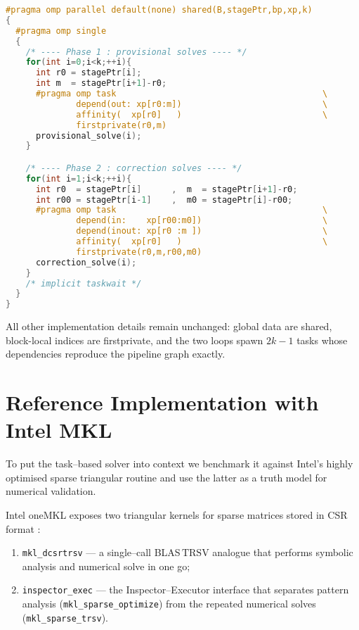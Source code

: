 \begin{lstlisting}[language=C++,caption={Core of
\texttt{blockBiDiagSolveTasksAffinity}.},label={lst:omp_skeleton_aff}]
#pragma omp parallel default(none) shared(B,stagePtr,bp,xp,k)
{
  #pragma omp single
  {
    /* ---- Phase 1 : provisional solves ---- */
    for(int i=0;i<k;++i){
      int r0 = stagePtr[i];
      int m  = stagePtr[i+1]-r0;
      #pragma omp task                                         \
              depend(out: xp[r0:m])                            \
              affinity(  xp[r0]   )                            \
              firstprivate(r0,m)
      provisional_solve(i);
    }

    /* ---- Phase 2 : correction solves ---- */
    for(int i=1;i<k;++i){
      int r0  = stagePtr[i]      ,  m  = stagePtr[i+1]-r0;
      int r00 = stagePtr[i-1]    ,  m0 = stagePtr[i]-r00;
      #pragma omp task                                         \
              depend(in:    xp[r00:m0])                        \
              depend(inout: xp[r0 :m ])                        \
              affinity(  xp[r0]   )                            \
              firstprivate(r0,m,r00,m0)
      correction_solve(i);
    }
    /* implicit taskwait */
  }
}
\end{lstlisting}

All other implementation details remain unchanged: global data are
\textsf{shared}, block-local indices are \textsf{firstprivate}, and the
two loops spawn $2k-1$ tasks whose dependencies reproduce the
pipeline graph exactly.
\section{Reference Implementation with Intel MKL}
\label{sec:impl_mkl}
To put the task--based solver into context we benchmark it against
Intel’s highly optimised sparse triangular routine and use the latter
as a truth model for numerical validation.

Intel oneMKL exposes two triangular kernels for sparse matrices stored
in CSR format \cite{intel_mkl_linux_devguide_2020}:

\begin{enumerate}
  \item \texttt{mkl\_dcsrtrsv}  
        — a single–call BLAS\,$\mathrm{TRSV}$ analogue that
        performs symbolic analysis and numerical solve in one go;
  \item \texttt{inspector\_exec}  
        — the Inspector–Executor interface that separates
        pattern analysis (\texttt{mkl\_sparse\_optimize}) from the
        repeated numerical solves
        (\texttt{mkl\_sparse\_trsv}).
\end{enumerate}

